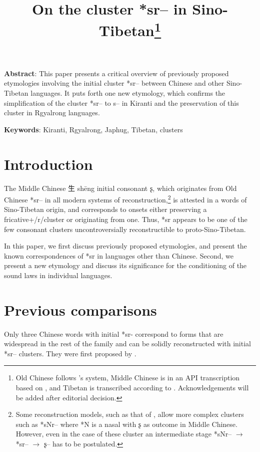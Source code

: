 \documentclass[oldfontcommands,oneside,a4paper,11pt]{article}
\newcommand{\ipa}[1]{{\phon #1}} %
\newcommand{\zh}[1]{{\cn #1}}
\begin{document}
 


\title{On the cluster *sr-- in Sino-Tibetan\footnote{Old Chinese follows \citealt{bs14oc}'s system, Middle Chinese is in an API transcription based on \citet{baxter92}, and Tibetan is transcribed according to \citet{jacques12transcription}. Acknowledgements will be added after editorial decision.} %
}
\maketitle


\textbf{Abstract}: This paper presents a critical overview of previously proposed etymologies involving the initial cluster *\ipa{sr--} between Chinese and other Sino-Tibetan languages. It puts forth one new etymology, which confirms the simplification of the cluster *\ipa{sr--} to \ipa{s--} in Kiranti and the preservation of this cluster in Rgyalrong languages.


\textbf{Keywords}: Kiranti, Rgyalrong, Japhug, Tibetan, clusters


\section{Introduction}

The Middle Chinese \zh{生} shēng initial consonant \ipa{ʂ}, which originates from Old Chinese *\ipa{sr--} in all modern systems of reconstruction,\footnote{Some reconstruction models, such as that of \citet{bs14oc}, allow more complex clusters such as *\ipa{sNr--} where *N is a nasal with \ipa{ʂ} as outcome in Middle Chinese. However, even in the case of these cluster an intermediate stage *\ipa{sNr--} $\rightarrow$ *\ipa{sr--} $\rightarrow$  \ipa{ʂ--} has to be postulated.} is attested in a words of Sino-Tibetan origin, and corresponds to onsets either preserving a fricative+/r/cluster or originating from one. Thus, *\ipa{sr} appears to be  one of the few consonant clusters uncontroversially reconstructible to proto-Sino-Tibetan. 

In this paper, we first discuss previously proposed etymologies, and present the known correspondences of *\ipa{sr} in languages other than Chinese. Second, we present a new etymology and discuss its significance for the conditioning of the sound laws in individual languages.

\section{Previous comparisons} \label{sec:previous}
Only three Chinese words with initial *\ipa{sr-} correspond to forms that are widespread in the rest of the family and can be solidly reconstructed with initial *\ipa{sr--} clusters.  They were first proposed by \citet{benedict72}.
\end{document}
